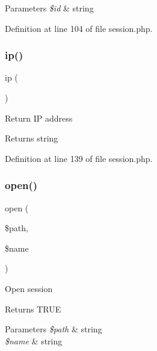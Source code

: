 \begin{DoxyParams}{Parameters}
{\em \$id} & string \\
\hline
\end{DoxyParams}


Definition at line 104 of file session.\+php.

\hypertarget{class_d_b_1_1_mongo_1_1_session_a197bae3714812901860bd006b00f91de}{}\label{class_d_b_1_1_mongo_1_1_session_a197bae3714812901860bd006b00f91de} 
\subsubsection{\texorpdfstring{ip()}{ip()}}
{\footnotesize\ttfamily ip (\begin{DoxyParamCaption}{ }\end{DoxyParamCaption})}

Return IP address \begin{DoxyReturn}{Returns}
string 
\end{DoxyReturn}


Definition at line 139 of file session.\+php.

\hypertarget{class_d_b_1_1_mongo_1_1_session_a037c59224bcb347b69ca61df88ef7230}{}\label{class_d_b_1_1_mongo_1_1_session_a037c59224bcb347b69ca61df88ef7230} 
\subsubsection{\texorpdfstring{open()}{open()}}
{\footnotesize\ttfamily open (\begin{DoxyParamCaption}\item[{}]{\$path,  }\item[{}]{\$name }\end{DoxyParamCaption})}

Open session \begin{DoxyReturn}{Returns}
T\+R\+UE 
\end{DoxyReturn}

\begin{DoxyParams}{Parameters}
{\em \$path} & string \\
\hline
{\em \$name} & string \\
\hline
\end{DoxyParams}


